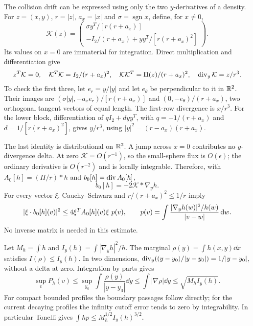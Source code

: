 The collision drift can be expressed using only the two $y$-derivatives of a density. For $z=(x,y)$, $r=|z|$, $a_x=|x|$ and $\sigma=\operatorname{sgn}x$, define, for $x\ne0$,
\begin{equation}\label{eq:tangent-kernel}
 \mathcal K(z)=\begin{pmatrix}
 \sigma y^T/[r(r+a_x)]\\
 -I_2/(r+a_x)+yy^T/[r(r+a_x)^2]
 \end{pmatrix}.
\end{equation}
Its values on $x=0$ are immaterial for integration. Direct multiplication and differentiation give
\begin{equation}\label{eq:tangent-identities}
 z^T\mathcal K=0,\quad
 \mathcal K^T\mathcal K=I_2/(r+a_x)^2,\quad
 \mathcal K\mathcal K^T=\Pi(z)/(r+a_x)^2,\quad
 \operatorname{div}_y\mathcal K=z/r^3.
\end{equation}
To check the first three, let $e_r=y/|y|$ and let $e_\theta$ be perpendicular to it in $\mathbb R^2$. Their images are
$(\sigma|y|,-a_xe_r)/[r(r+a_x)]$ and $(0,-e_\theta)/(r+a_x)$, two orthogonal tangent vectors of equal length. The first-row divergence is $x/r^3$. For the lower block, differentiation of $qI_2+dyy^T$, with $q=-1/(r+a_x)$ and $d=1/[r(r+a_x)^2]$, gives $y/r^3$, using $|y|^2=(r-a_x)(r+a_x)$.

The last identity is distributional on $\mathbb R^3$. A jump across $x=0$ contributes no $y$-divergence delta. At zero $\mathcal K=O(r^{-1})$, so the small-sphere flux is $O(\epsilon)$; the ordinary derivative is $O(r^{-2})$ and is locally integrable. Therefore, with $A_0[h]=(\Pi/r)*h$ and $b_0[h]=\operatorname{div} A_0[h]$,
\[
 b_0[h]=-2\mathcal K*\nabla_yh.
\]
For every vector $\xi$, Cauchy--Schwarz and $r/(r+a_x)^2\le1/r$ imply
\begin{equation}\label{eq:drift-direction}
 |\xi\cdot b_0[h](v)|^2\le4\xi^TA_0[h](v)\xi\ p(v),\qquad
 p(v)=\int\frac{|\nabla_yh(w)|^2/h(w)}{|v-w|}\,\mathrm dw.
\end{equation}
No inverse matrix is needed in this estimate.

Let $M_h=\int h$ and $I_y(h)=\int|\nabla_yh|^2/h$. The marginal $\rho(y)=\int h(x,y)\dd x$ satisfies $I(\rho)\le I_y(h)$. In two dimensions,
$\operatorname{div}_y((y-y_0)/|y-y_0|)=1/|y-y_0|$, without a delta at zero. Integration by parts gives
\begin{equation}\label{eq:transverse-potential}
 \sup_v P_h(v)\le\sup_{y_0}\int\frac{\rho(y)}{|y-y_0|}\dd y
 \le\int|\nabla\rho|\dd y\le\sqrt{M_hI_y(h)}.
\end{equation}
For compact bounded profiles the boundary passages follow directly; for the current decaying profiles the infinity cutoff error tends to zero by integrability. In particular Tonelli gives $\int hp\le M_h^{1/2}I_y(h)^{3/2}$.

